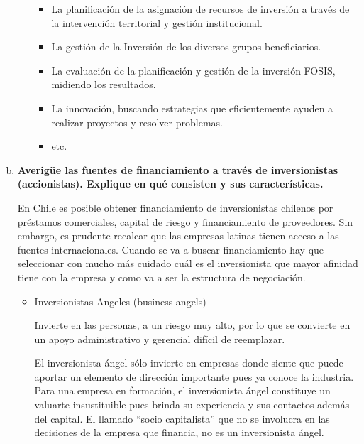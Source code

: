 \begin{enumerate}[(a)]
\begin{itemize}
                    \begin{itemize}
                        \item La planificación de la asignación de recursos de inversión a través de la intervención territorial y gestión institucional.
                        \item La gestión de la Inversión de los diversos grupos beneficiarios.
                        \item La evaluación de la planificación y gestión de la inversión FOSIS, midiendo los resultados.
                        \item La innovación, buscando estrategias que eficientemente ayuden a realizar proyectos y resolver problemas.
                        \item etc.
                    \end{itemize}
        \end{itemize}


    \newpage 
    \item {\bf Averigüe las fuentes de financiamiento a través de inversionistas (accionistas).
          Explique en qué consisten y sus características.}\\


            En Chile es posible obtener financiamiento de inversionistas chilenos por préstamos comerciales, capital de riesgo y 
            financiamiento de proveedores. Sin embargo, es prudente recalcar que las empresas latinas tienen acceso a las fuentes 
            internacionales. Cuando se va a buscar financiamiento hay que seleccionar con mucho más cuidado cuál es el inversionista 
            que mayor afinidad tiene con la empresa y como va a ser la estructura de negociación.
           
            \begin{itemize}
                \item Inversionistas Angeles (business angels)
            
                    Invierte en las personas, a un riesgo muy alto, por lo que se convierte en un apoyo administrativo y gerencial difícil de reemplazar.

                    El inversionista ángel sólo invierte en empresas donde siente que puede aportar un elemento de dirección importante pues ya 
                    conoce la industria. Para una empresa en formación, el inversionista ángel constituye un valuarte insustituible pues brinda su 
                    experiencia y sus contactos además del capital. El llamado ``socio capitalista'' que no se involucra en las decisiones de la empresa 
                    que financia, no es un inversionista ángel.
            

\end{itemize}
\end{enumerate}
